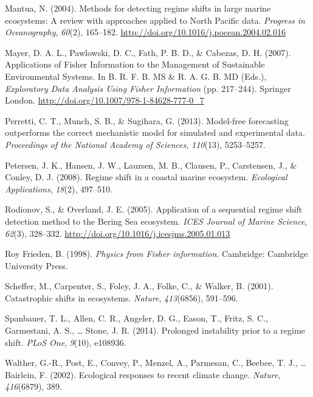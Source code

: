 \documentclass[12pt,twoside,openany]{reedthesis}
\begin{document}
\hypertarget{ref-mantua_methods_2004}{}
Mantua, N. (2004). Methods for detecting regime shifts in large marine
ecosystems: A review with approaches applied to North Pacific data.
\emph{Progress in Oceanography}, \emph{60}(2), 165--182.
\url{http://doi.org/10.1016/j.pocean.2004.02.016}

\hypertarget{ref-mayer_applications_2007}{}
Mayer, D. A. L., Pawlowski, D. C., Fath, P. B. D., \& Cabezas, D. H.
(2007). Applications of Fisher Information to the Management of
Sustainable Environmental Systems. In B. R. F. B. MS \& R. A. G. B. MD
(Eds.), \emph{Exploratory Data Analysis Using Fisher Information} (pp.
217--244). Springer London.
\url{http://doi.org/10.1007/978-1-84628-777-0_7}

\hypertarget{ref-perretti_model-free_2013}{}
Perretti, C. T., Munch, S. B., \& Sugihara, G. (2013). Model-free
forecasting outperforms the correct mechanistic model for simulated and
experimental data. \emph{Proceedings of the National Academy of
Sciences}, \emph{110}(13), 5253--5257.

\hypertarget{ref-petersen2008regime}{}
Petersen, J. K., Hansen, J. W., Laursen, M. B., Clausen, P., Carstensen,
J., \& Conley, D. J. (2008). Regime shift in a coastal marine ecosystem.
\emph{Ecological Applications}, \emph{18}(2), 497--510.

\hypertarget{ref-rodionov_application_2005}{}
Rodionov, S., \& Overland, J. E. (2005). Application of a sequential
regime shift detection method to the Bering Sea ecosystem. \emph{ICES
Journal of Marine Science}, \emph{62}(3), 328--332.
\url{http://doi.org/10.1016/j.icesjms.2005.01.013}

\hypertarget{ref-roy_frieden_physics_1998}{}
Roy Frieden, B. (1998). \emph{Physics from Fisher information}.
Cambridge: Cambridge University Press.

\hypertarget{ref-scheffer_catastrophic_2001}{}
Scheffer, M., Carpenter, S., Foley, J. A., Folke, C., \& Walker, B.
(2001). Catastrophic shifts in ecosystems. \emph{Nature},
\emph{413}(6856), 591--596.

\hypertarget{ref-spanbauer_prolonged_2014}{}
Spanbauer, T. L., Allen, C. R., Angeler, D. G., Eason, T., Fritz, S. C.,
Garmestani, A. S., \ldots{} Stone, J. R. (2014). Prolonged instability
prior to a regime shift. \emph{PLoS One}, \emph{9}(10), e108936.

\hypertarget{ref-walther_ecological_2002}{}
Walther, G.-R., Post, E., Convey, P., Menzel, A., Parmesan, C., Beebee,
T. J., \ldots{} Bairlein, F. (2002). Ecological responses to recent
climate change. \emph{Nature}, \emph{416}(6879), 389.
\end{document}
